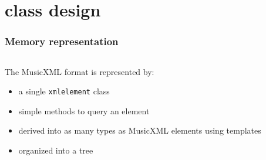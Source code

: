 \documentclass{beamer}
\begin{document}
\section{class   design}
\begin{frame}
	\frametitle{Memory representation}
	\begin{columns}
		\begin{column}[c]{7cm}
		The MusicXML format is represented by:
		{\small
 			  
\begin{itemize}
			  \item<1-> a single \texttt{xmlelement} class
			  \item<3-> simple methods to query an element
			  \item<5-> derived into as many types as MusicXML elements using templates
			  \item<7-> organized into a tree
			  \end{itemize}}
		\end{column}


\end{columns}
\end{frame}
\end{document}
